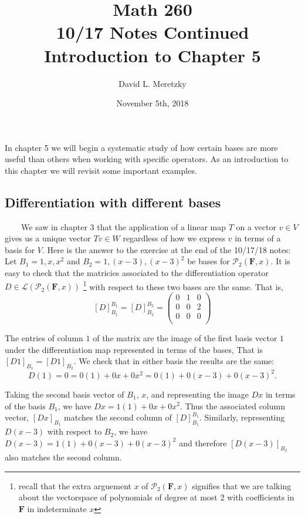 \documentclass{article}
\title{ \vspace{-10ex} %
Math 260\\ 10/17 Notes Continued \\
Introduction to Chapter 5
}
\author{David L. Meretzky
}
\date{%
November 5th, 2018
}
\theoremstyle{problemstyle}
\begin{document}
\maketitle

In chapter 5 we will begin a systematic study of how certain bases are more useful than others when working with specific operators. As an introduction to this chapter we will revisit some important examples.

\subsection*{Differentiation with different bases}
\ \ \ \  We saw in chapter $3$ that the application of a linear map $T$ on a vector $v \in V$ gives us a unique vector $Tv \in W$ regardless of how we express $v$ in terms of a basis for $V$. Here is the answer to the exercise at the end of the 10/17/18 notes:\\

Let $B_1 = 1,x,x^2$ and $B_2 = 1, (x-3), (x-3)^2$ be bases for $\mathcal{P}_2(\textbf{F},x)$. It is easy to check that the matricies associated to the differentiation operator $D \in \mathscr{L}(\mathcal{P}_2(\textbf{F},x))$ \footnote{recall that the extra arguement $x$ of $\mathcal{P}_2(\textbf{F},x)$ signifies that we are talking about the vectorspace of polynomials of degree at most 2 with coefficients in $\textbf{F}$ in indeterminate $x$} with respect to these two bases are the same. That is, $$[D]_{B_1}^{B_1} = [D]_{B_2}^{B_2} =
\begin{pmatrix} 0 & 1& 0  \\
 0 & 0& 2   \\
  0 & 0& 0   \\
\end{pmatrix}
$$

The entries of column $1$ of the matrix are the image of the first basis vector $1$ under the differentiation map represented in terms of the bases, That is $[D1]_{B_1} = [D1]_{B_2}$. We check that in either basis the results are the same: $$D(1) = 0 = 0(1)+0x+0x^2 = 0(1)+0(x-3)+0(x-3)^2.$$

Taking the second basis vector of $B_1$, $x$, and representing the image $Dx$ in terms of the basis $B_1$, we have $Dx = 1(1)+0x+0x^2$.  Thus the associated column vector, $[Dx]_{B_1}$ matches the second column of $[D]_{B_1}^{B_1}$. Similarly, representing $D(x-3)$ with respect to $B_2$, we have $D(x-3) = 1(1)+0(x-3)+0(x-3)^2$ and therefore $[D(x-3)]_{B_2}$ also matches the second column. \\
\end{document}
